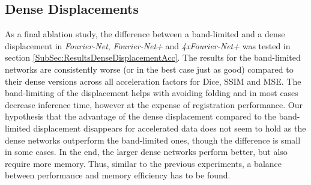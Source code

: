 \subsection{Dense Displacements} \label{SubSec:DiscussionDenseDisplacements}
As a final ablation study, the difference between a band-limited and a dense displacement in \emph{Fourier-Net}, \emph{Fourier-Net+} and \emph{4xFourier-Net+} was tested in section \ref{SubSec:ResultsDenseDisplacementAcc}. The results for the band-limited networks are consistently worse (or in the best case just as good) compared to their dense versions across all acceleration factors for Dice, SSIM and MSE. The band-limiting of the displacement helps with avoiding folding and in most cases decrease inference time, however at the expense of registration performance. Our hypothesis that the advantage of the dense displacement compared to the band-limited displacement disappears for accelerated data does not seem to hold as the dense networks outperform the band-limited ones, though the difference is small in some cases. In the end, the larger dense networks perform better, but also require more memory. Thus, similar to the previous experiments, a balance between performance and memory efficiency has to be found.

